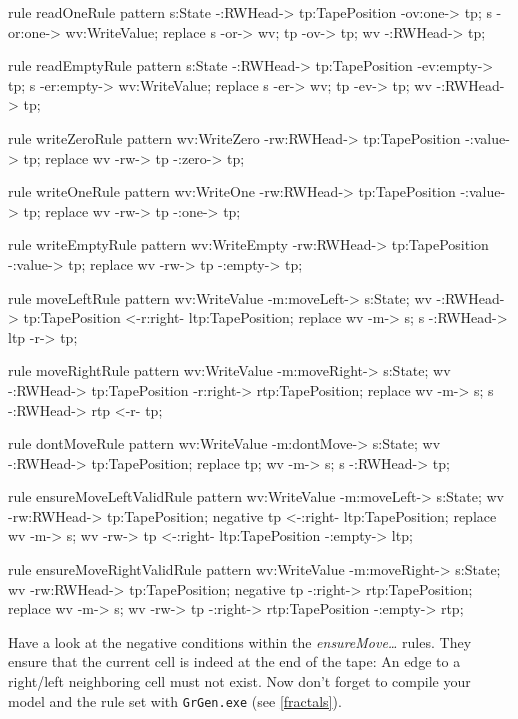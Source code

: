 \begin{grgen}[firstnumber=last] 
rule readOneRule {
	pattern {
		s:State -:RWHead-> tp:TapePosition -ov:one-> tp;
		s -or:one-> wv:WriteValue;
	}
	replace {
		s -or-> wv;
		tp -ov-> tp;
		wv -:RWHead-> tp;
	}
}

rule readEmptyRule {
	pattern {
		s:State -:RWHead-> tp:TapePosition -ev:empty-> tp;
		s -er:empty-> wv:WriteValue;
	}
	replace {
		s -er-> wv;
		tp -ev-> tp;
		wv -:RWHead-> tp;
	}
}

rule writeZeroRule {
	pattern {
		wv:WriteZero -rw:RWHead-> tp:TapePosition -:value-> tp;
	}
	replace {
		wv -rw-> tp -:zero-> tp;
	}	
}

rule writeOneRule {
	pattern {
		wv:WriteOne -rw:RWHead-> tp:TapePosition -:value-> tp;
	}
	replace {
		wv -rw-> tp -:one-> tp;
	}	
}

rule writeEmptyRule {
	pattern {
		wv:WriteEmpty -rw:RWHead-> tp:TapePosition -:value-> tp;
	}
	replace {
		wv -rw-> tp -:empty-> tp;
	}	
}

rule moveLeftRule {
	pattern {
		wv:WriteValue -m:moveLeft-> s:State;
		wv -:RWHead-> tp:TapePosition <-r:right- ltp:TapePosition;
	}
	replace {
		wv -m-> s;
		s -:RWHead-> ltp -r-> tp;
	}
}

rule moveRightRule {
	pattern {
		wv:WriteValue -m:moveRight-> s:State;
		wv -:RWHead-> tp:TapePosition -r:right-> rtp:TapePosition;
	}
	replace {
		wv -m-> s;
		s -:RWHead-> rtp <-r- tp;
	}
}

rule dontMoveRule {
	pattern {
		wv:WriteValue -m:dontMove-> s:State;
		wv -:RWHead-> tp:TapePosition;
	}
	replace {
		tp;
		wv -m-> s;
		s -:RWHead-> tp;
	}
}

rule ensureMoveLeftValidRule {
	pattern {
		wv:WriteValue -m:moveLeft-> s:State;
		wv -rw:RWHead-> tp:TapePosition;
		negative {
			tp <-:right- ltp:TapePosition;
		}
	}
	replace {
		wv -m-> s;
		wv -rw-> tp <-:right- ltp:TapePosition -:empty-> ltp;
	}
}

rule ensureMoveRightValidRule {
	pattern {
		wv:WriteValue -m:moveRight-> s:State;
		wv -rw:RWHead-> tp:TapePosition;
		negative {
			tp -:right-> rtp:TapePosition;
		}
	}
	replace {
		wv -m-> s;
		wv -rw-> tp -:right-> rtp:TapePosition -:empty-> rtp;
	}
}
\end{grgen}
Have a look at the negative conditions within the \emph{ensureMove\dots} rules. They ensure that the current cell is indeed at the end of the tape: An edge to a right/left neighboring cell must not exist. Now don't forget to compile your model and the rule set with \texttt{GrGen.exe} (see \ref{fractals}).

